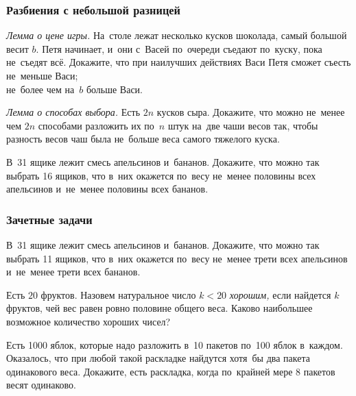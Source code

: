 \subsubsection*{Разбиения с небольшой разницей}

\begin{exercises}

\item\emph{Лемма о цене игры.}
На~столе лежат несколько кусков шоколада, самый большой весит $b$.
Петя начинает, и~они с~Васей по~очереди съедают по~куску, пока не~съедят всё.
Докажите, что при наилучших действиях Васи Петя сможет съесть
\\
\subproblem не~меньше Васи;
\\
\subproblem не~более чем на~$b$ больше Васи.

\item\emph{Лемма о способах выбора.}
Есть $2n$ кусков сыра.
Докажите, что можно не~менее чем $2n$ способами разложить их по~$n$ штук на~две
чаши весов так, чтобы разность весов чаш была не~больше веса самого тяжелого
куска.

\item
В~31 ящике лежит смесь апельсинов и~бананов.
Докажите, что можно так выбрать
16 ящиков, что в~них окажется по~весу не~менее половины всех апельсинов
и~не~менее половины всех бананов.

\end{exercises}

\subsubsection*{Зачетные задачи}

\begin{problems}

\item
В~31 ящике лежит смесь апельсинов и~бананов.
Докажите, что можно так выбрать
11 ящиков, что в~них окажется по~весу не~менее трети всех апельсинов
и~не~менее трети всех бананов.

\item
Есть $20$ фруктов.
Назовем натуральное число $k < 20$ \emph{хорошим,} если найдется $k$ фруктов,
чей вес равен ровно половине общего веса.
Каково наибольшее возможное количество хороших чисел?

\item
Есть 1000 яблок, которые надо разложить в~10 пакетов по~100 яблок в~каждом.
Оказалось, что при любой такой раскладке найдутся хотя~бы два пакета
одинакового веса.
Докажите, есть раскладка, когда по~крайней мере 8 пакетов весят одинаково.

\end{problems}


